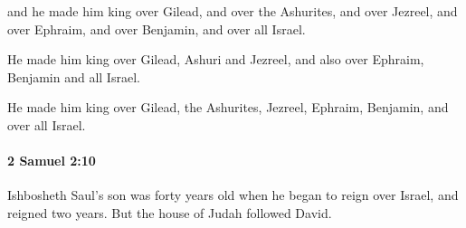 			\begin{versebox}
					\item[BHS] 
					\item[ASV] and he made him king over Gilead, and over the Ashurites, and over Jezreel, and over Ephraim, and over Benjamin, and over all Israel.
					\item[NIV] He made him king over Gilead, Ashuri and Jezreel, and also over Ephraim, Benjamin and all Israel.
					\item[NRSV] He made him king over Gilead, the Ashurites, Jezreel, Ephraim, Benjamin, and over all Israel.
			\end{versebox}

		\paragraph{2 Samuel 2:10} %
			\label{2SAMUEL-2-10}

			Ishbosheth Saul’s son was forty years old when he began to reign over Israel, and reigned two years. But the house of Judah followed David.

